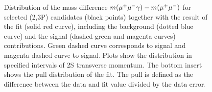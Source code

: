 \begin{figure}[H]
\begin{picture}
  \end{picture}
  \caption {\small
    Distribution of the mass difference $m(\mumu\gamma) - m(\mumu)$ for selected
    \chib(2,3P) candidates (black points) together with the result of the fit
    (solid red curve), including the background (dotted blue curve) and the
    signal (dashed green and magenta curves) contributions. Green dashed curve
    corresponds to \chibone signal and magenta dashed curve to \chibtwo signal.
    Plots show the distribution in specified intervals of \Y2S transverse
    momentum. The bottom insert shows the  pull distribution of the fit. The
    pull is defined as the difference  between the data and fit value divided
    by the data error. }
  \label{fig:chib-2s:fits}
\end{figure}
